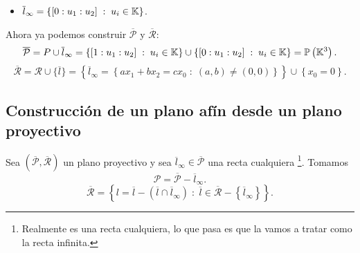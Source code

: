 \begin{eg}
\begin{itemize}
	\item $\displaystyle \overline{l}_{\infty} = \left\{ [0 : u_{1} : u_{2}] \; : \; u_{i} \in \mathbb{K}\right\}  $.
\end{itemize}
Ahora ya podemos construir $\displaystyle \overline{\mathcal{P}} $ y $\displaystyle \overline{\mathcal{R}} $:
\[\overline{\mathcal{P}} = P \cup \overline{l}_{\infty} = \left\{ [1 : u_{1} : u_{2}] \; : \; u_{i} \in \mathbb{K}\right\} \cup \left\{ [0 : u_{1} : u_{2}] \; : \; u_{i} \in \mathbb{K}\right\} = \mathbb{P}\left(\mathbb{K}^{3}\right).\]
\[\overline{\mathcal{R}} = \mathcal{R} \cup \{\overline{l}\} = \left\{ \overline{l}_{\infty} = \left\{ ax_{1} + bx_{2} = cx_{0} \; : \; \left(a,b\right) \neq \left(0,0\right)\right\} \right\} \cup \left\{ x_{0} = 0\right\}  .\]
\end{eg}
 
\subsection{Construcción de un plano afín desde un plano proyectivo}
Sea $\displaystyle \left(\overline{\mathcal{P}}, \overline{\mathcal{R}}\right) $ un plano proyectivo y sea $\displaystyle \overline{l}_{\infty} \in \overline{\mathcal{P}} $ una recta cualquiera \footnote{Realmente es una recta cualquiera, lo que pasa es que la vamos a tratar como la recta infinita.}. Tomamos 
\[ \mathcal{P} = \overline{\mathcal{P}}  - \overline{l}_{\infty}.\]
\[ \overline{\mathcal{R}} = \left\{ l = \overline{l} - \left(\overline{l} \cap \overline{l}_{\infty}\right) \; : \; \overline{l} \in \overline{\mathcal{R}} - \left\{ \overline{l}_{\infty}\right\} \right\}.\]


